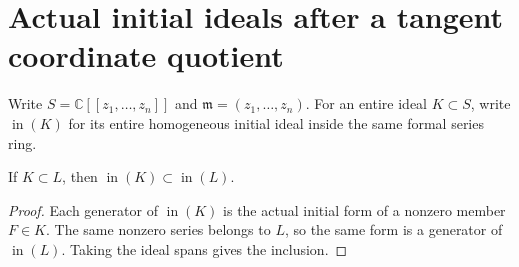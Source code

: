 \section{Actual initial ideals after a tangent coordinate quotient}

Write $S=\mathbb C[[z_1,\ldots,z_n]]$ and
$\mathfrak m=(z_1,\ldots,z_n)$. For an entire ideal $K\subset S$,
write $\operatorname{in}(K)$ for its entire homogeneous initial ideal
inside the same formal series ring.

\begin{lemma}
\label{hir:actual-initial-coordinate-quotient-monotonicity}
\leanok
If $K\subset L$, then $\operatorname{in}(K)\subset\operatorname{in}(L)$.
\end{lemma}
\begin{proof}
Each generator of $\operatorname{in}(K)$ is the actual initial form of
a nonzero member $F\in K$. The same nonzero series belongs to $L$,
so the same form is a generator of $\operatorname{in}(L)$. Taking the
ideal spans gives the inclusion.
\end{proof}

